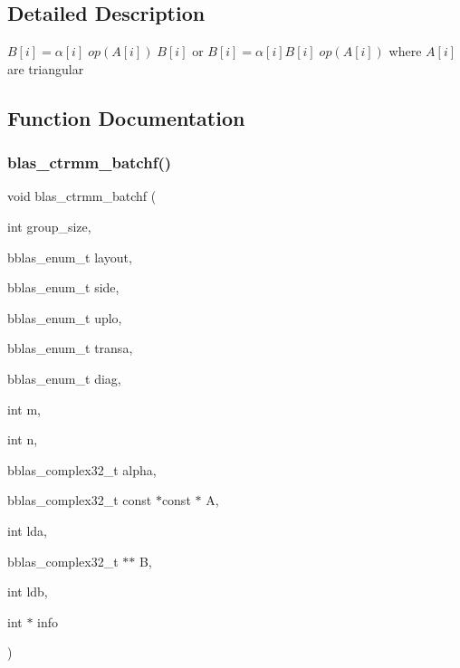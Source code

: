 \subsection{Detailed Description}
$ B[i] = \alpha[i] \;op(A[i])\; B[i] $ or $ B[i] = \alpha[i] B[i] \;op(A[i]) $ where $ A[i] $ are triangular 



\subsection{Function Documentation}
\mbox{\label{group__trmm__batchf_ga64f7bbfcf4afda9c0cb5ed92dfe875ea}} 
\subsubsection{\texorpdfstring{blas\+\_\+ctrmm\+\_\+batchf()}{blas\_ctrmm\_batchf()}}
{\footnotesize\ttfamily void blas\+\_\+ctrmm\+\_\+batchf (\begin{DoxyParamCaption}\item[{int}]{group\+\_\+size,  }\item[{bblas\+\_\+enum\+\_\+t}]{layout,  }\item[{bblas\+\_\+enum\+\_\+t}]{side,  }\item[{bblas\+\_\+enum\+\_\+t}]{uplo,  }\item[{bblas\+\_\+enum\+\_\+t}]{transa,  }\item[{bblas\+\_\+enum\+\_\+t}]{diag,  }\item[{int}]{m,  }\item[{int}]{n,  }\item[{bblas\+\_\+complex32\+\_\+t}]{alpha,  }\item[{bblas\+\_\+complex32\+\_\+t const $\ast$const $\ast$}]{A,  }\item[{int}]{lda,  }\item[{bblas\+\_\+complex32\+\_\+t $\ast$$\ast$}]{B,  }\item[{int}]{ldb,  }\item[{int $\ast$}]{info }\end{DoxyParamCaption})}


